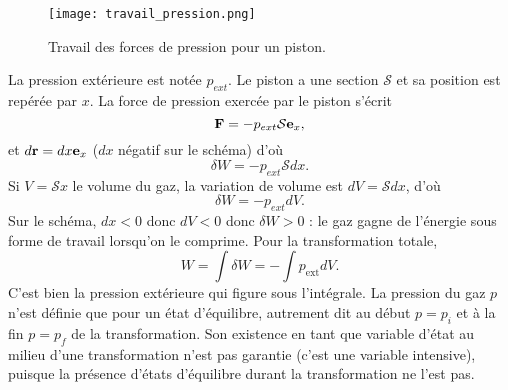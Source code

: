 \documentclass[11pt,a4paper]{report}
\begin{document}
\begin{figure}[h!]
\begin{center}
	\texttt{[image: travail\_pression.png]}
	\caption{Travail des forces de pression pour un piston.} 
	\label{fig:travail_pression}
\end{center}
\end{figure}

La pression extérieure est notée $p_{ext}$. Le piston a une section $\mathcal{S}$ et sa position est repérée par $x$.
La force de pression exercée par le piston s'écrit
\begin{equation}
	\bold{F} = -p_{ext}\mathcal{S}\bold{e}_x,
\end{equation}
et $d\bold{r} = dx \bold{e}_x$ ($dx$ négatif sur le schéma)
d'où 
\begin{equation}
	\delta W = - p_{ext}\mathcal{S}dx. 
\end{equation}
Si $V = \mathcal{S}x$ le volume du gaz, la variation de volume est $dV = \mathcal{S}dx$, d'où
\begin{equation}
	\delta W = - p_{ext}dV.
\end{equation}
Sur le schéma, $dx <0$ donc $dV <0$ donc $\delta W > 0$ : le gaz gagne de l'énergie sous forme de travail lorsqu'on le comprime.
Pour la transformation totale,
\begin{equation}
	W = \int\delta W = -\int p_\text{ext}dV.
\end{equation}
C'est bien la pression extérieure qui figure sous l'intégrale. La pression du gaz $p$ n'est définie que pour un état d'équilibre, autrement dit au début $p = p_i$ et à la fin $p = p_f$ de la transformation. Son existence en tant que variable d'état au milieu d'une transformation n'est pas garantie (c'est une variable intensive), puisque la présence d'états d'équilibre durant la transformation ne l'est pas.
\end{document}
